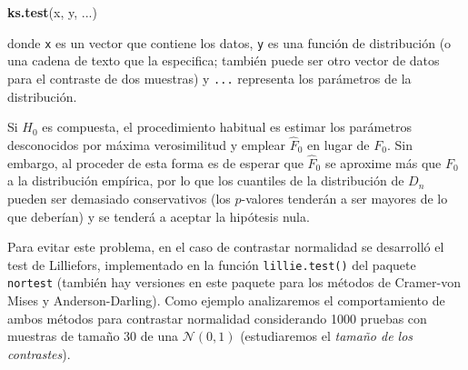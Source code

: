 \documentclass[]{book}
\newenvironment{Shaded}{\begin{snugshade}}{\end{snugshade}}
\newcommand{\KeywordTok}[1]{\textcolor[rgb]{0.13,0.29,0.53}{\textbf{#1}}}
\newcommand{\DecValTok}[1]{\textcolor[rgb]{0.00,0.00,0.81}{#1}}
\newcommand{\StringTok}[1]{\textcolor[rgb]{0.31,0.60,0.02}{#1}}
\newcommand{\CommentTok}[1]{\textcolor[rgb]{0.56,0.35,0.01}{\textit{#1}}}
\newcommand{\ControlFlowTok}[1]{\textcolor[rgb]{0.13,0.29,0.53}{\textbf{#1}}}
\newcommand{\OperatorTok}[1]{\textcolor[rgb]{0.81,0.36,0.00}{\textbf{#1}}}
\newcommand{\NormalTok}[1]{#1}
\theoremstyle{break}
\theoremstyle{definition}
\theoremstyle{definition}
\theoremstyle{definition}
\theoremstyle{remark}
\begin{document}
\begin{Shaded}
\begin{Highlighting}[]
\KeywordTok{ks.test}\NormalTok{(x, y, ...)}
\end{Highlighting}
\end{Shaded}

donde \texttt{x} es un vector que contiene los datos, \texttt{y} es una
función de distribución (o una cadena de texto que la especifica;
también puede ser otro vector de datos para el contraste de dos
muestras) y \texttt{...} representa los parámetros de la distribución.

Si \(H_0\) es compuesta, el procedimiento habitual es estimar los
parámetros desconocidos por máxima verosimilitud y emplear \(\hat{F}_0\)
en lugar de \(F_0\). Sin embargo, al proceder de esta forma es de
esperar que \(\hat{F}_0\) se aproxime más que \(F_0\) a la distribución
empírica, por lo que los cuantiles de la distribución de \(D_n\) pueden
ser demasiado conservativos (los \(p\)-valores tenderán a ser mayores de
lo que deberían) y se tenderá a aceptar la hipótesis nula.

Para evitar este problema, en el caso de contrastar normalidad se
desarrolló el test de Lilliefors, implementado en la función
\texttt{lillie.test()} del paquete \texttt{nortest} (también hay
versiones en este paquete para los métodos de Cramer-von Mises y
Anderson-Darling). Como ejemplo analizaremos el comportamiento de ambos
métodos para contrastar normalidad considerando 1000 pruebas con
muestras de tamaño 30 de una \(\mathcal{N}(0,1)\) (estudiaremos el
\emph{tamaño de los contrastes}).

\begin{Shaded}
\end{Shaded}
\end{document}
